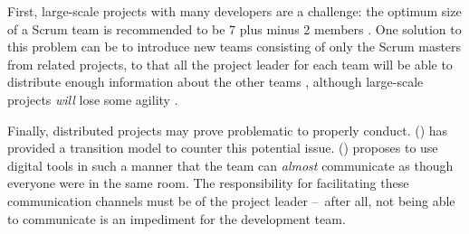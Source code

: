 First, large-scale projects with many developers are a challenge: the optimum size of a Scrum team is recommended to be 7 plus minus 2 members \autocite{scrumprimer}. One solution to this problem can be to introduce new teams consisting of only the Scrum masters from related projects, to that all the project leader for each team will be able to distribute enough information about the other teams \autocite{lyon:scaling} \autocite{maranzato:megaframework}, although large-scale projects \emph{will} lose some agility \autocite{lyon:scaling}.

Finally, distributed projects may prove problematic to properly conduct. \citeauthor{suresshrini} (\citeyear{suresshrini}) has provided a transition model to counter this potential issue. \citeauthor{warstory} (\citeyear{warstory}) proposes to use digital tools in such a manner that the team can \emph{almost} communicate as though everyone were in the same room. The responsibility for facilitating these communication channels must be of the project leader – after all, not being able to communicate is an impediment for the development team.
